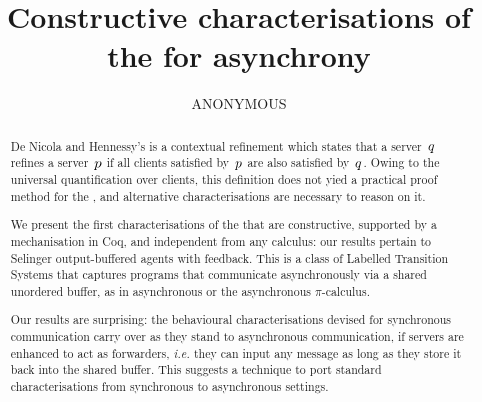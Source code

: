 \documentclass[english,a4paper,anonymous,cleveref,thm-restate]{lipics-style/lipics-v2021}
\title{Constructive characterisations of the
  \texorpdfstring{\mustpreorder}{MUST-preorder} for asynchrony}
\author{ANONYMOUS}{HIDDEN}{}{}{}
\newcommand{\ie}{{\em i.e.}\xspace}
\begin{document}
\maketitle

\begin{abstract}
  De Nicola and Hennessy's \mustpreorder is a contextual refinement which states
that a server~$q$ refines a server~$p$ if all clients satisfied
by~$p$ are also satisfied by~$q$. Owing to the universal
quantification over clients, this definition does not yied a practical proof
method for the \mustpreorder,  %
and alternative characterisations are necessary to reason on it.

We present the first characterisations of the \mustpreorder
that are constructive, supported by a mechanisation in Coq,
and independent from any calculus:
our results pertain to Selinger output-buffered
agents with feedback. This is a class of Labelled Transition Systems
that captures programs that communicate asynchronously via
a shared unordered buffer, as in
{asynchronous \CCS or the
asynchronous $\pi$-calculus.}

Our results are surprising: the behavioural characterisations
devised for synchronous communication carry over as they stand
to asynchronous communication, if servers are enhanced to act as forwarders,
\ie they can input any message as long as they
store it back into the shared buffer.
This suggests a technique to port standard characterisations
from synchronous to asynchronous settings.
\end{abstract}





\renewcommand{\state}{p}
\renewcommand{\stateA}{p_1}
\renewcommand{\stateB}{p_2}
\renewcommand{\stateC}{q_3}
\newcommand{\stdleq}{\mathrel{\preccurlyeq_{\mathsf{std}}}}
\renewcommand{\state}{p}
\renewcommand{\stateA}{p'}
\renewcommand{\trace}{s}

\newcommand{\asleqC}{\preccurlyeq_{\textsf{cnv}}}
\newcommand{\asleqA}{\preccurlyeq_{\textsf{acc}}}
\newcommand{\asleqAfw}{\preccurlyeq^{\fw}_{\textsf{acc}}}

\newcommand{\util}{\rightarrow\equiv}


\newcommand{\oh}{\mathcal{O}_p}
\newcommand{\ohmy}{O}
\newcommand{\ogood}{O_{\mathsf{good}}}
\renewcommand{\States}{C}




%
%
%
%
%
\appendix%
\label{sec:appendix}


%

%







\end{document}
